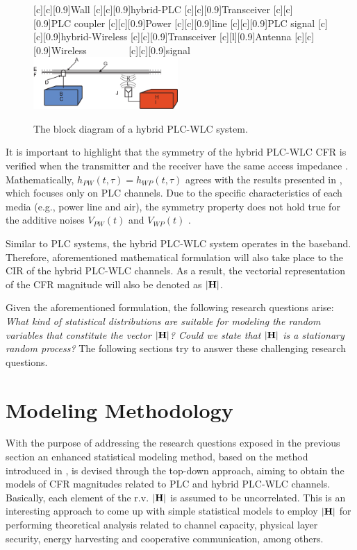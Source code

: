 \documentclass[journal]{IEEEtran}
\begin{document}
\begin{figure}[h]
	\centering
	[c][0.9]{Wall}
	[c][0.9]{hybrid-PLC}
	[c][0.9]{Transceiver}
	[c][0.9]{PLC coupler}
	[c][0.9]{Power}
	[c][0.9]{line}
	[c][0.9]{PLC signal}
	[c][0.9]{hybrid-Wireless}
	[c][0.9]{Transceiver}
	[l][0.9]{Antenna}
	[c][0.9]{Wireless$~~~~~~~~~~~~~~~~~~$}
	[c][0.9]{signal$~~~~~~~~~~~~~~~~~$}
	\includegraphics[width=0.49\textwidth]{images/Hybrid_channel.eps}
	\caption{The block diagram of a hybrid PLC-WLC system.}
	\label{Hybchannel}
\end{figure}

It is important to highlight that the symmetry of the hybrid \ac{PLC}-\ac{WLC} \ac{CFR} is verified when the transmitter and the receiver have the same access impedance \cite{thiago:hyb}. Mathematically, $h_{PW}(t,\tau)=h_{WP}(t,\tau)$ agrees with the results presented in \cite{Galli:indoor}, which focuses only on \ac{PLC} channels. Due to the specific characteristics of each media (e.g., power line and air), the symmetry property does not hold true for the additive noises $V_{PW}(t)$ and $V_{WP}(t)$ \cite{thiago:hyb}. 

Similar to \ac{PLC} systems, the hybrid \ac{PLC}-\ac{WLC} system operates in the baseband. Therefore, aforementioned mathematical formulation will also take place to the \ac{CIR} of the hybrid \ac{PLC}-\ac{WLC} channels. As a result, the vectorial representation of the \ac{CFR} magnitude will also be denoted as $|{\bf H}|$. 
 
Given the aforementioned formulation, the following research questions arise: \textit{What kind of statistical distributions are suitable for modeling the random variables that constitute the vector $|{\bf H}|$? Could we state that $|{\bf H}|$ is a stationary random process?} The following sections try to answer these challenging research questions.

\section{Modeling Methodology}

With the purpose of addressing the research questions exposed in the previous section an enhanced statistical modeling method, based on the method introduced in \cite{Luis:AI}, is devised through the top-down approach, aiming to obtain the models of \ac{CFR} magnitudes related to \ac{PLC} and hybrid \ac{PLC}-\ac{WLC} channels. Basically, each element of the \ac{r.v.} ${\bf |H|}$ is assumed to be uncorrelated. This is an interesting approach to come up with simple statistical models to employ ${\bf |H|}$ for performing theoretical analysis related to channel capacity, physical layer security, energy harvesting and cooperative communication, among others.
\end{document}
